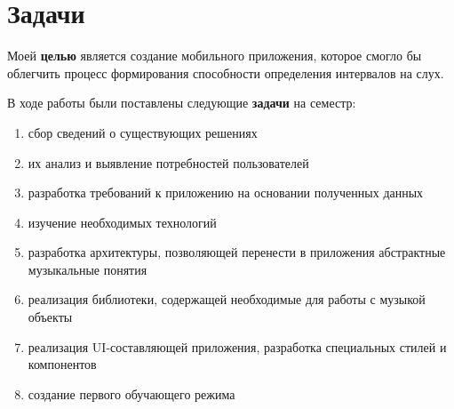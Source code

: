 \chapter*{Задачи}

Моей \textbf{целью} является создание мобильного приложения, которое смогло бы облегчить процесс формирования способности определения интервалов на слух. \medskip\par
В ходе работы были поставлены следующие \textbf{задачи} на семестр:
\begin{enumerate}
\item сбор сведений о существующих решениях
\item их анализ и выявление потребностей пользователей
\item разработка требований к приложению на основании полученных данных
\item изучение необходимых технологий
\item разработка архитектуры, позволяющей перенести в приложения абстрактные музыкальные понятия
\item реализация библиотеки, содержащей необходимые для работы с музыкой объекты
\item реализация UI-составляющей приложения, разработка специальных стилей и компонентов
\item создание первого обучающего режима
\end{enumerate}\par